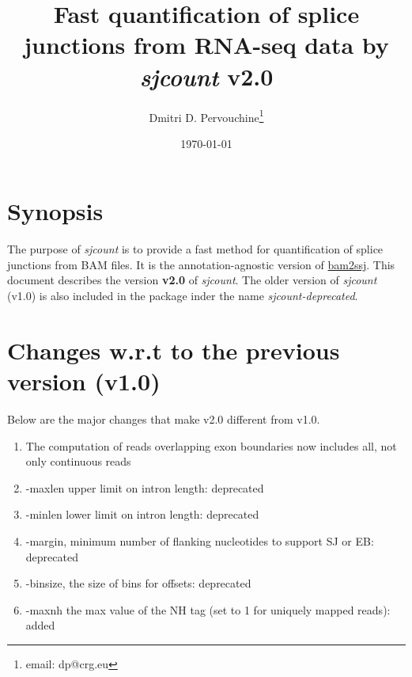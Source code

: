 \documentclass{article}
\begin{document}
\title{Fast quantification of splice junctions from RNA-seq data by {\em sjcount} v2.0}

\author{Dmitri D. Pervouchine\thanks{email: dp@crg.eu}}

\date{\today}
\maketitle

\section{Synopsis}

The purpose of {\em sjcount} is to provide a fast method for quantification of splice junctions from BAM files. It is the annotation-agnostic version of 
\href{https://github.com/pervouchine/bam2ssj}{bam2ssj}. This document describes the version {\bf v2.0} of {\em sjcount}. The older version of {\em sjcount}
(v1.0) is also included in the package inder the name {\em sjcount-deprecated}.

\section{Changes w.r.t to the previous version (v1.0)}
Below are the major changes that make v2.0 different from v1.0.
\begin{enumerate}
\item The computation of reads overlapping exon boundaries now includes all, not only continuous reads
\item -maxlen upper limit on intron length: deprecated
\item -minlen lower limit on intron length: deprecated
\item -margin, minimum number of flanking nucleotides to support SJ or EB: deprecated
\item -binsize, the size of bins for offsets: deprecated
\item -maxnh the max value of the NH tag (set to 1 for uniquely mapped reads): added 
\end{enumerate}
\end{document}
